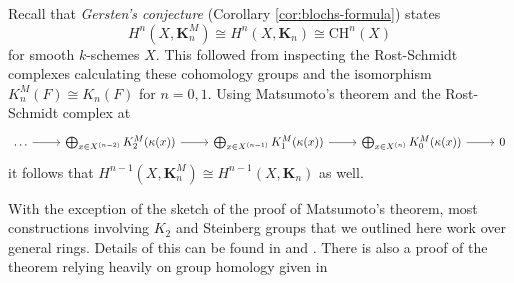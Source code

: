 Recall that \emph{Gersten's conjecture} (Corollary \ref{cor:blochs-formula}) states
\[
    H^n(X, \mathbf{K}_n^M) \cong H^n(X, \mathbf{K}_n) \cong \mathrm{CH}^n(X)
\]
for smooth $k$-schemes $X$. This followed from inspecting the Rost-Schmidt complexes calculating these cohomology groups and the isomorphism $K_n^M(F) \cong K_n(F)$ for $n = 0, 1$. Using Matsumoto's theorem and the Rost-Schmidt complex at
\[
    \begin{tikzcd}
        \arrow[from=1-1, to=1-2]
        \arrow[from=1-2, to=1-3]
        \arrow[from=1-3, to=1-4]
        \arrow[from=1-4, to=1-5]
        \ldots & \bigoplus_{x \in X^{(n - 2)}} K_2^M(\kappa(x)) & \bigoplus_{x \in X^{(n - 1)}} K_1^M(\kappa(x)) & \bigoplus_{x \in X^{(n)}} K_0^M(\kappa(x)) & 0
    \end{tikzcd}
\]
it follows that $H^{n - 1}(X, \mathbf{K}_n^M) \cong H^{n - 1}(X, \mathbf{K}_n)$ as well.

With the exception of the sketch of the proof of Matsumoto's theorem, most constructions involving $K_2$ and Steinberg groups that we outlined here work over general rings. Details of this can be found in \cite{Kbook} and \cite{MilnorK}. There is also a proof of the theorem relying heavily on group homology given in \cite{Hutchinson}
